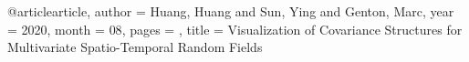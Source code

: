 @article{article,
author = {Huang, Huang and Sun, Ying and Genton, Marc},
year = {2020},
month = {08},
pages = {},
title = {Visualization of Covariance Structures for Multivariate Spatio-Temporal Random Fields}
}